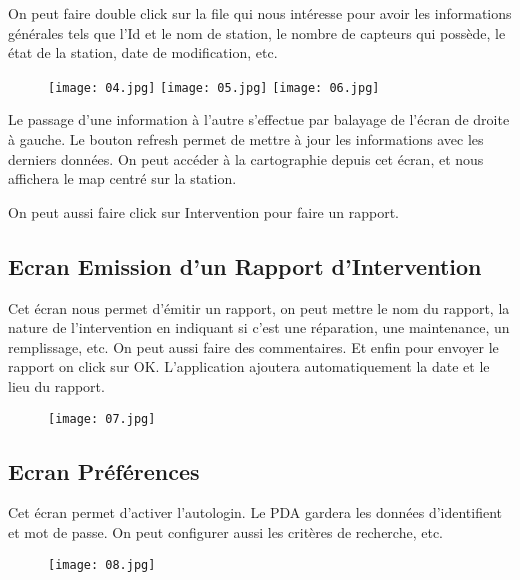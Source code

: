 On peut faire double click sur la file qui nous intéresse pour avoir les informations générales tels que l'Id et le nom de station, le nombre de capteurs qui possède, le état de la station, date de modification, etc.

\begin{figure}[!htbp]
\begin{center}
\texttt{[image: 04.jpg]}              
\texttt{[image: 05.jpg]}              
\texttt{[image: 06.jpg]}              
\end{center}
\end{figure} 
Le passage d'une information à l'autre s'effectue par balayage de l'écran de droite à gauche. 
Le bouton refresh permet de mettre à jour les informations avec les derniers données.
On peut accéder à la cartographie depuis cet écran, et nous affichera le map centré sur la station.

On peut aussi faire click sur Intervention pour faire un rapport.\newpage

\subsection{Ecran Emission d'un Rapport d'Intervention}
Cet écran nous permet d'émitir un rapport, on peut mettre le nom du rapport, la nature de l'intervention en indiquant si c'est une réparation, une maintenance, un remplissage, etc. 
On peut aussi faire des commentaires. Et enfin pour envoyer le rapport on click sur OK. L'application ajoutera automatiquement la date et le lieu du rapport.

\begin{figure}[!h] 
\begin{center}
\texttt{[image: 07.jpg]}
\end{center}
\end{figure}

\subsection{Ecran Préférences}
Cet écran permet d'activer l'autologin. Le PDA gardera les données d'identifient et mot de passe.
On peut configurer aussi les critères de recherche, etc.
\begin{figure}[!h] 
\begin{center}
\texttt{[image: 08.jpg]}
\end{center}
\end{figure}



